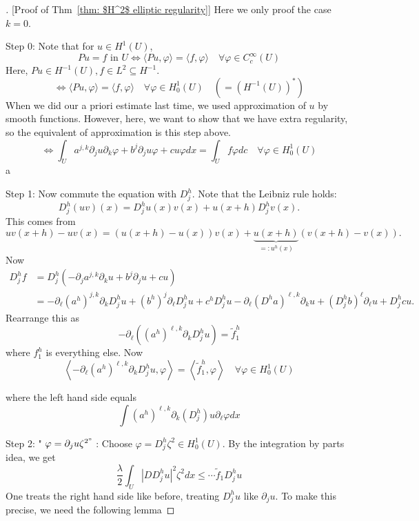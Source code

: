\vspace{2em}
\begin{proof}[][Proof of Thm~\ref{thm: $H^2$ elliptic regularity}]
Here we only proof the case $k=0$. 

Step 0: Note that for $u \in H^{1}(U)$,
$$
P u=f \text { in } U \Longleftrightarrow\langle P u, \varphi\rangle=\langle f, \varphi\rangle \quad \forall \varphi \in C_{c}^{\infty}(U)
$$
Here, $P u \in H^{-1}(U), f \in L^{2} \subseteq H^{-1}$.
$$
\Longleftrightarrow\langle P u, \varphi\rangle=\langle f, \varphi\rangle \quad \forall \varphi \in H_{0}^{1}(U) \quad\left(=\left(H^{-1}(U)\right)^{*}\right)
$$
When we did our a priori estimate last time, we used approximation of $u$ by smooth functions. However, here, we want to show that we have extra regularity, so the equivalent of approximation is this step above.
$$
\Longleftrightarrow \int_{U} a^{j, k} \partial_{j} u \partial_{k} \varphi+b^{j} \partial_{j} u \varphi+c u \varphi d x=\int_{U} f \varphi d c \quad \forall \varphi \in H_{0}^{1}(U)
$$a


\noindent Step 1: Now commute the equation with $D_{j}^{h}$. Note that the Leibniz rule holds:
$$
D_{j}^{h}(u v)(x)=D_{j}^{h} u(x) v(x)+u(x+h) D_{j}^{h} v(x) .
$$
This comes from
$$
u v(x+h)-u v(x)=(u(x+h)-u(x)) v(x)+\underbrace{u(x+h)}_{=: u^{h}(x)}(v(x+h)-v(x)) .
$$
Now
$$
\begin{aligned}
D_{j}^{h} f &=D_{j}^{h}\left(-\partial_{j} a^{j, k} \partial_{k} u+b^{j} \partial_{j} u+c u\right) \\
&=-\partial_{\ell}\left(a^{h}\right)^{j, k} \partial_{k} D_{j}^{h} u+\left(b^{h}\right)^{j} \partial_{\ell} D_{j}^{h} u+c^{h} D_{j}^{h} u-\partial_{\ell}\left(D^{h} a\right)^{\ell, k} \partial_{k} u+\left(D_{j}^{h} b\right)^{\ell} \partial_{\ell} u+D_{j}^{h} c u .
\end{aligned}
$$
Rearrange this as
$$
-\partial_{\ell}\left(\left(a^{h}\right)^{\ell, k} \partial_{k} D_{j}^{h} u\right)=\widetilde{f}_{1}^{h}
$$
where $f_{1}^{h}$ is everything else. Now
$$
\left\langle-\partial_{\ell}\left(a^{h}\right)^{\ell, k} \partial_{k} D_{j}^{h} u, \varphi\right\rangle=\left\langle\widetilde{f}_{1}^{h}, \varphi\right\rangle \quad \forall \varphi \in H_{0}^{1}(U)
$$

where the left hand side equals
$$
\int\left(a^{h}\right)^{\ell, k} \partial_{k}\left(D_{j}^{h}\right) u \partial_{\ell} \varphi d x
$$

\noindent Step 2: " $\varphi=\partial_{j} u \zeta^{2 "}$ : Choose $\varphi=D_{j}^{h} \zeta^{2} \in H_{0}^{1}(U)$. By the integration by parts idea, we get
$$
\frac{\lambda}{2} \int_{U}\left|D D_{j}^{h} u\right|^{2} \zeta^{2} d x \leq \cdots \widetilde{f}_{1} D_{j}^{h} u
$$
One treats the right hand side like before, treating $D_{j}^{h} u$ like $\partial_{j} u$. To make this precise, we need the following lemma


\end{proof}
